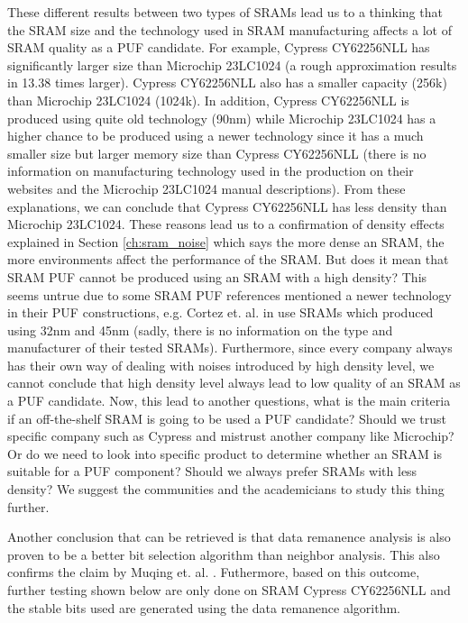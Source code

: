 These different results between two types of SRAMs lead us to a thinking that the SRAM size and the technology used in SRAM manufacturing affects a lot of SRAM quality as a PUF candidate. For example, Cypress CY62256NLL has significantly larger size than Microchip 23LC1024 (a rough approximation results in 13.38 times larger). Cypress CY62256NLL also has a smaller capacity (256k) than Microchip 23LC1024 (1024k). In addition, Cypress CY62256NLL is produced using quite old technology (90nm) while Microchip 23LC1024 has a higher chance to be produced using a newer technology since it has a much smaller size but larger memory size than Cypress CY62256NLL (there is no information on manufacturing technology used in the production on their websites and the Microchip 23LC1024 manual descriptions). From these explanations, we can conclude that Cypress CY62256NLL has less density than Microchip 23LC1024. These reasons lead us to a confirmation of density effects  explained in Section \ref{ch:sram_noise} which says the more dense an SRAM, the more environments affect the performance of the SRAM. But does it mean that SRAM PUF cannot be produced using an SRAM with a high density? This seems untrue due to some SRAM PUF references mentioned a newer technology in their PUF constructions, e.g. Cortez et. al. in \cite{7102498} use SRAMs which produced using 32nm and 45nm (sadly, there is no information on the type and manufacturer of their tested SRAMs). Furthermore, since every company always has their own way of dealing with noises introduced by high density level, we cannot conclude that high density level always lead to low quality of an SRAM as a PUF candidate. Now, this lead to another questions, what is the main criteria if an off-the-shelf SRAM is going to be used a PUF candidate? Should we trust specific company such as Cypress and mistrust another company like Microchip? Or do we need to look into specific product to determine whether an SRAM is suitable for a PUF component? Should we always prefer SRAMs with less density?
We suggest the communities and the academicians to study this thing further.

Another conclusion that can be retrieved is that data remanence analysis is also proven to be a better bit selection algorithm than neighbor analysis. This also confirms the claim by Muqing et. al. \cite{liu_zhou_tang_parhi_kim_2017}. Futhermore, based on this outcome, further testing shown below are only done on SRAM Cypress CY62256NLL and the stable bits used are generated using the data remanence algorithm.

